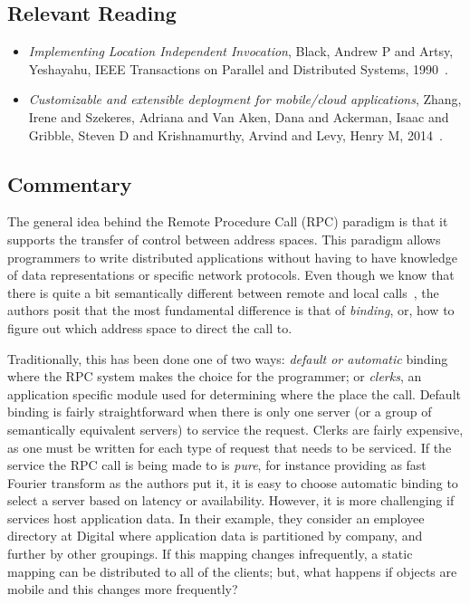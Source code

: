\subsection{Relevant Reading}

\begin{itemize}
	\item \textit{Implementing Location Independent Invocation}, Black, Andrew P and Artsy, Yeshayahu, IEEE Transactions on Parallel and Distributed Systems, 1990~\cite{black1990implementing}.
	\item \textit{Customizable and extensible deployment for mobile/cloud applications}, Zhang, Irene and Szekeres, Adriana and Van Aken, Dana and Ackerman, Isaac and Gribble, Steven D and Krishnamurthy, Arvind and Levy, Henry M, 2014~\cite{zhang2014customizable}.
\end{itemize}

\subsection{Commentary}

The general idea behind the Remote Procedure Call (RPC) paradigm is that it supports the transfer of control between address spaces.  This paradigm allows programmers to write distributed applications without having to have knowledge of data representations or specific network protocols.  Even though we know that there is quite a bit semantically different between remote and local calls~\cite{kendall1994note, black1990implementing}, the authors posit that the most fundamental difference is that of \textit{binding}, or, how to figure out which address space to direct the call to.

Traditionally, this has been done one of two ways: \textit{default or automatic} binding where the RPC system makes the choice for the programmer; or \textit{clerks}, an application specific module used for determining where the place the call.  Default binding is fairly straightforward when there is only one server (or a group of semantically equivalent servers) to service the request.  Clerks are fairly expensive, as one must be written for each type of request that needs to be serviced.  If the service the RPC call is being made to is \textit{pure}, for instance providing as fast Fourier transform as the authors put it, it is easy to choose automatic binding to select a server based on latency or availability.  However, it is more challenging if services host application data.  In their example, they consider an employee directory at Digital where application data is partitioned by company, and further by other groupings.  If this mapping changes infrequently, a static mapping can be distributed to all of the clients; but, what happens if objects are mobile and this changes more frequently?

